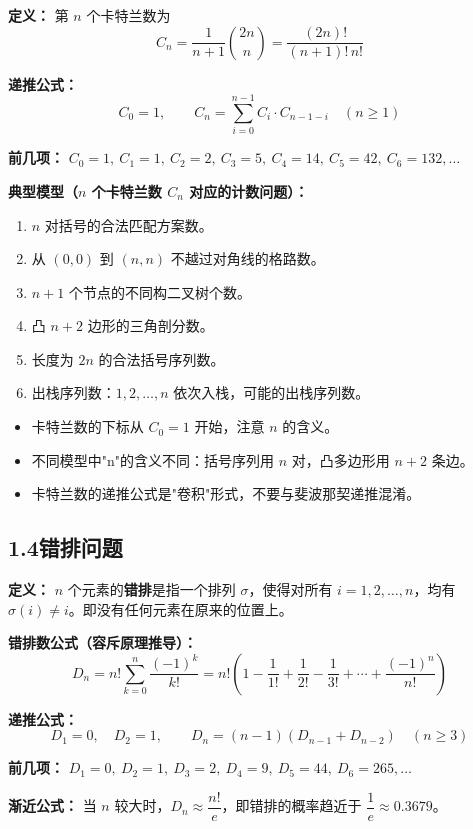 \documentclass[12pt, a4paper]{ctexart}
\begin{document}
\begin{knowledgebox}
\textbf{定义：} 第 \(n\) 个卡特兰数为
\[
C_n = \frac{1}{n+1}\binom{2n}{n} = \frac{(2n)!}{(n+1)!\,n!}
\]

\textbf{递推公式：}
\[
C_0 = 1, \qquad C_n = \sum_{i=0}^{n-1} C_i \cdot C_{n-1-i} \quad (n \ge 1)
\]

\textbf{前几项：} \(C_0=1,\ C_1=1,\ C_2=2,\ C_3=5,\ C_4=14,\ C_5=42,\ C_6=132, \ldots\)

\textbf{典型模型（\(n\) 个卡特兰数 \(C_n\) 对应的计数问题）：}
\begin{enumerate}[leftmargin=1.5em]
  \item \(n\) 对括号的合法匹配方案数。
  \item 从 \((0,0)\) 到 \((n,n)\) 不越过对角线的格路数。
  \item \(n+1\) 个节点的不同构二叉树个数。
  \item 凸 \(n+2\) 边形的三角剖分数。
  \item 长度为 \(2n\) 的合法括号序列数。
  \item 出栈序列数：\(1,2,\ldots,n\) 依次入栈，可能的出栈序列数。
\end{enumerate}
\end{knowledgebox}

\begin{warnbox}[易错提醒]
\begin{itemize}[leftmargin=1.5em]
  \item 卡特兰数的下标从 \(C_0=1\) 开始，注意 \(n\) 的含义。
  \item 不同模型中"n"的含义不同：括号序列用 \(n\) 对，凸多边形用 \(n+2\) 条边。
  \item 卡特兰数的递推公式是"卷积"形式，不要与斐波那契递推混淆。
\end{itemize}
\end{warnbox}

\subsection*{1.4\quad 错排问题}

\begin{knowledgebox}
\textbf{定义：} \(n\) 个元素的\textbf{错排}是指一个排列 \(\sigma\)，使得对所有 \(i=1,2,\ldots,n\)，均有 \(\sigma(i) \ne i\)。即没有任何元素在原来的位置上。

\textbf{错排数公式（容斥原理推导）：}
\[
D_n = n!\sum_{k=0}^{n}\frac{(-1)^k}{k!} = n!\left(1 - \frac{1}{1!} + \frac{1}{2!} - \frac{1}{3!} + \cdots + \frac{(-1)^n}{n!}\right)
\]

\textbf{递推公式：}
\[
D_1 = 0,\quad D_2 = 1, \qquad D_n = (n-1)(D_{n-1} + D_{n-2}) \quad (n \ge 3)
\]

\textbf{前几项：} \(D_1=0,\ D_2=1,\ D_3=2,\ D_4=9,\ D_5=44,\ D_6=265, \ldots\)

\textbf{渐近公式：} 当 \(n\) 较大时，\(D_n \approx \dfrac{n!}{e}\)，即错排的概率趋近于 \(\dfrac{1}{e} \approx 0.3679\)。
\end{knowledgebox}
\end{document}
